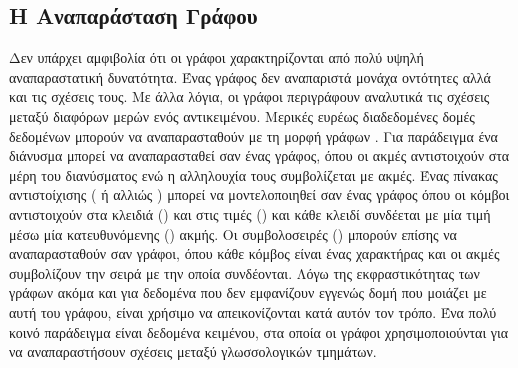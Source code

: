 \subsection{Η Αναπαράσταση Γράφου}
Δεν υπάρχει αμφιβολία ότι οι γράφοι χαρακτηρίζονται από πολύ υψηλή αναπαραστατική δυνατότητα.
Ένας γράφος δεν αναπαριστά μονάχα οντότητες αλλά και τις σχέσεις τους.
Με άλλα λόγια, οι γράφοι περιγράφουν αναλυτικά τις σχέσεις μεταξύ διαφόρων μερών ενός αντικειμένου. 
Μερικές ευρέως διαδεδομένες δομές δεδομένων μπορούν να αναπαρασταθούν με τη μορφή γράφων \cite{borgwardt2007}. 
Για παράδειγμα ένα διάνυσμα μπορεί να αναπαρασταθεί σαν ένας γράφος, όπου οι ακμές αντιστοιχούν στα μέρη του διανύσματος ενώ η αλληλουχία τους συμβολίζεται με ακμές.
Ένας πίνακας αντιστοίχισης ( ή αλλιώς ) μπορεί να μοντελοποιηθεί σαν ένας γράφος όπου οι κόμβοι αντιστοιχούν στα κλειδιά () και στις τιμές () και κάθε κλειδί συνδέεται με μία τιμή μέσω μία κατευθυνόμενης () ακμής. 
Οι συμβολοσειρές () μπορούν επίσης να αναπαρασταθούν σαν γράφοι, όπου κάθε κόμβος είναι ένας χαρακτήρας και οι ακμές συμβολίζουν την σειρά με την οποία συνδέονται.
Λόγω της εκφραστικότητας των γράφων ακόμα και για δεδομένα που δεν εμφανίζουν εγγενώς δομή που μοιάζει με αυτή του γράφου, είναι χρήσιμο να απεικονίζονται κατά αυτόν τον τρόπο.
Ένα πολύ κοινό παράδειγμα είναι δεδομένα κειμένου, στα οποία οι γράφοι χρησιμοποιούνται για να αναπαραστήσουν σχέσεις μεταξύ γλωσσολογικών τμημάτων.
